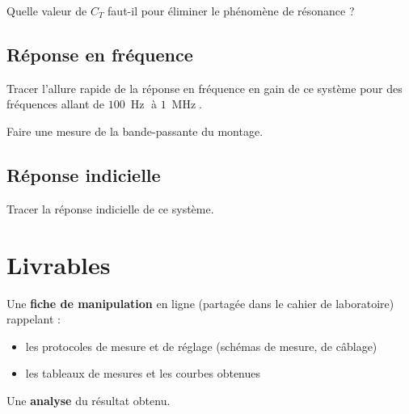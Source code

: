 \Quest Quelle valeur de $C_T$ faut-il pour éliminer le phénomène de résonance ?

\subsection{Réponse en fréquence}

\Manip Tracer l'allure rapide de la réponse en fréquence en gain de ce système pour des fréquences allant de $100~\operatorname{Hz}$ à $1~\operatorname{MHz}$.

\Manip Faire une mesure de la bande-passante du montage.

\subsection{Réponse indicielle}

\Manip Tracer la réponse indicielle de ce système.


\section{Livrables}


Une \textbf{fiche de manipulation} en ligne (partagée dans le cahier de laboratoire) rappelant :

\begin{itemize}
	\item les protocoles de mesure et de réglage (schémas de mesure, de câblage)	
	\item les tableaux de mesures et les courbes obtenues
\end{itemize}

Une \textbf{analyse} du résultat obtenu.



